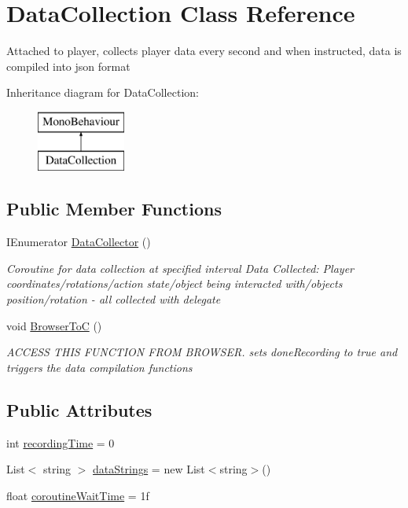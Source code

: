 \hypertarget{class_data_collection}{}\section{Data\+Collection Class Reference}
\label{class_data_collection}


Attached to player, collects player data every second and when instructed, data is compiled into json format  


Inheritance diagram for Data\+Collection\+:\begin{figure}[H]
\begin{center}
\leavevmode
\includegraphics[height=2.000000cm]{class_data_collection}
\end{center}
\end{figure}
\subsection*{Public Member Functions}
\begin{DoxyCompactItemize}
\item 
I\+Enumerator \hyperlink{class_data_collection_aeafbb969c7d88168f64f48ee42b2051d}{Data\+Collector} ()
\begin{DoxyCompactList}\small\item\em Coroutine for data collection at specified interval Data Collected\+: Player coordinates/rotations/action state/object being interacted with/objects position/rotation -\/ all collected with delegate \end{DoxyCompactList}\item 
void \hyperlink{class_data_collection_aeb1fc2071face3f9b41aea7a81c9ea48}{Browser\+ToC} ()
\begin{DoxyCompactList}\small\item\em A\+C\+C\+E\+SS T\+H\+IS F\+U\+N\+C\+T\+I\+ON F\+R\+OM B\+R\+O\+W\+S\+ER. sets done\+Recording to true and triggers the data compilation functions \end{DoxyCompactList}\end{DoxyCompactItemize}
\subsection*{Public Attributes}
\begin{DoxyCompactItemize}
\item 
int \hyperlink{class_data_collection_a8af35a5b2260dd692601c715f188f0e3}{recording\+Time} = 0
\item 
List$<$ string $>$ \hyperlink{class_data_collection_a239a38e434c21993aa890a51e284b5cc}{data\+Strings} = new List$<$string$>$()
\item 
float \hyperlink{class_data_collection_a18ef2fb2993192dfefdcad5b110493a2}{coroutine\+Wait\+Time} = 1f
\end{DoxyCompactItemize}


